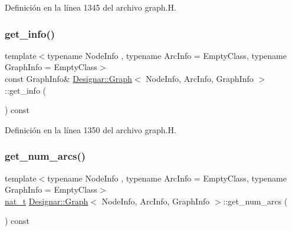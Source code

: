 Definición en la línea 1345 del archivo graph.\+H.

\mbox{\label{class_designar_1_1_graph_adfbae301b6a211adaf1919bc41db176a}} 
\subsubsection{\texorpdfstring{get\+\_\+info()}{get\_info()}\hspace{0.1cm}{\footnotesize\ttfamily [2/2]}}
{\footnotesize\ttfamily template$<$typename Node\+Info , typename Arc\+Info  = Empty\+Class, typename Graph\+Info  = Empty\+Class$>$ \\
const Graph\+Info\& \hyperlink{class_designar_1_1_graph}{Designar\+::\+Graph}$<$ Node\+Info, Arc\+Info, Graph\+Info $>$\+::get\+\_\+info (\begin{DoxyParamCaption}{ }\end{DoxyParamCaption}) const\hspace{0.3cm}{\ttfamily [inline]}}



Definición en la línea 1350 del archivo graph.\+H.

\mbox{\label{class_designar_1_1_graph_a5b155eda66a4c90f6a34b25c80d9342b}} 
\subsubsection{\texorpdfstring{get\+\_\+num\+\_\+arcs()}{get\_num\_arcs()}}
{\footnotesize\ttfamily template$<$typename Node\+Info , typename Arc\+Info  = Empty\+Class, typename Graph\+Info  = Empty\+Class$>$ \\
\hyperlink{namespace_designar_aa72662848b9f4815e7bf31a7cf3e33d1}{nat\+\_\+t} \hyperlink{class_designar_1_1_graph}{Designar\+::\+Graph}$<$ Node\+Info, Arc\+Info, Graph\+Info $>$\+::get\+\_\+num\+\_\+arcs (\begin{DoxyParamCaption}{ }\end{DoxyParamCaption}) const\hspace{0.3cm}{\ttfamily [inline]}}



